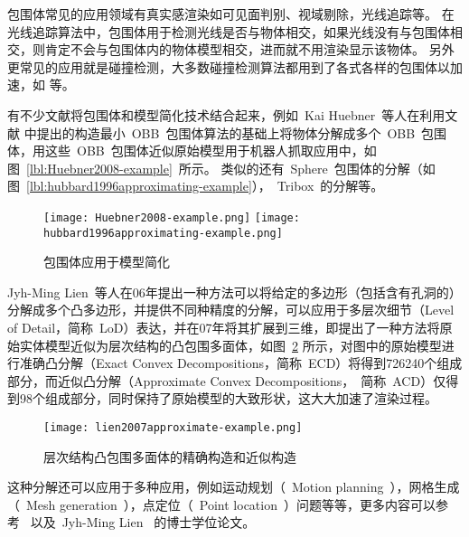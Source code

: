 包围体常见的应用领域有真实感渲染如可见面判别、视域剔除\cite{assarsson2000optimized}，光线追踪\cite{wald2007ray}等。
在光线追踪算法中，包围体用于检测光线是否与物体相交，如果光线没有与包围体相交，则肯定不会与包围体内的物体模型相交，进而就不用渲染显示该物体。
另外更常见的应用就是碰撞检测\cite{wangzhiqiang1999}，大多数碰撞检测算法都用到了各式各样的包围体以加速，如
 等。

有不少文献将包围体和模型简化技术结合起来，例如~Kai Huebner~等人\cite{huebner2008minimum}在利用文献
中提出的构造最小~OBB~包围体算法的基础上将物体分解成多个~OBB~包围体，用这些~OBB~包围体近似原始模型用于机器人抓取应用中，如图~\ref{lbl:Huebner2008-example}~所示。
类似的还有~Sphere~包围体的分解\cite{hubbard1996approximating}（如图~\ref{lbl:hubbard1996approximating-example}），~Tribox~的分解\cite{crosnier1999tribox}等。
\begin{figure}[htbp]
  \centering
    {\texttt{[image: Huebner2008-example.png]}}
    {\texttt{[image: hubbard1996approximating-example.png]}}
  \caption{包围体应用于模型简化}
  \label{lbl:bounding-voluems-used-in-shape-approximation}
\end{figure}
Jyh-Ming Lien~\cite{lien2006approximate2d}等人在06年提出一种方法可以将给定的多边形（包括含有孔洞的）分解成多个凸多边形，并提供不同种精度的分解，可以应用于多层次细节（Level of
Detail，简称~LoD）表达，并在07年将其扩展到三维\cite{lien2007approximate3d}，即提出了一种方法将原始实体模型近似为层次结构的凸包围多面体，如图~\ref{lbl:lien2007approximate-example}
所示，对图中的原始模型进行准确凸分解（Exact Convex
Decompositions，简称~ECD）将得到726240个组成部分，而近似凸分解（Approximate Convex
Decompositions，~简称~ACD）仅得到98个组成部分，同时保持了原始模型的大致形状，这大大加速了渲染过程。
\begin{figure}[htbp]
\centering
\texttt{[image: lien2007approximate-example.png]}
\caption{层次结构凸包围多面体的精确构造和近似构造\cite{lien2007approximate3d}}
\label{lbl:lien2007approximate-example}
\end{figure}
这种分解还可以应用于多种应用，例如运动规划（~Motion planning~），网格生成（~Mesh generation~），点定位（~Point location~）问题等等，更多内容可以参考~ 以及~Jyh-Ming Lien~ 的博士学位论文\cite{lien2006approximatephd}。


